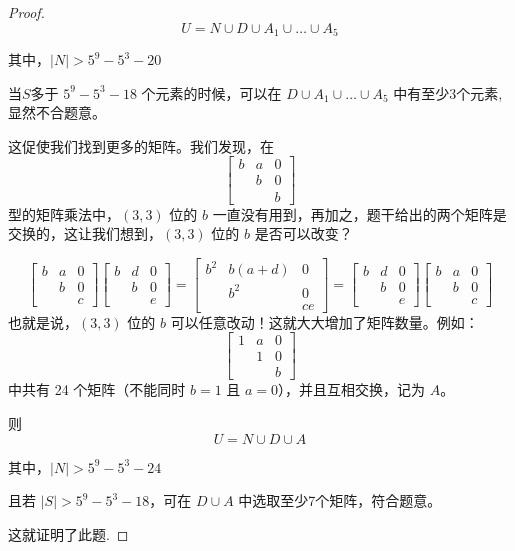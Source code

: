 \documentclass[12pt]{ctexart}  %
\begin{document}
\begin{proof}
\[
U = N \cup D \cup A_1 \cup \dots \cup A_5
\]

其中，$|N|>5^9-5^3-20$

当$S$多于 \(5^9-5^3-18\) 个元素的时候，可以在 \(D\cup A_1 \cup \dots \cup A_5\) 中有至少3个元素,显然不合题意。

这促使我们找到更多的矩阵。我们发现，在
\[
\begin{bmatrix}
b & a & 0 \\
& b & 0 \\
& & b
\end{bmatrix}
\]
型的矩阵乘法中，\((3,3)\) 位的 \(b\) 一直没有用到，再加之，题干给出的两个矩阵是交换的，这让我们想到，\((3,3)\) 位的 \(b\) 是否可以改变？

\[
\begin{bmatrix}
b & a & 0 \\
& b & 0 \\
& & c
\end{bmatrix}
\begin{bmatrix}
b & d & 0 \\
& b & 0 \\
& & e
\end{bmatrix}
=
\begin{bmatrix}
b^2 & b(a+d) & 0 \\
& b^2 & 0 \\
& & ce
\end{bmatrix}
=
\begin{bmatrix}
b & d & 0 \\
& b & 0 \\
& & e
\end{bmatrix}
\begin{bmatrix}
b & a & 0 \\
& b & 0 \\
& & c
\end{bmatrix}
\]
也就是说，\((3,3)\) 位的 \(b\) 可以任意改动！这就大大增加了矩阵数量。例如：
\[
\begin{bmatrix}
1 & a & 0 \\
& 1 & 0 \\
& & b
\end{bmatrix}
\]
中共有 24 个矩阵（不能同时 \(b=1\) 且 \(a=0\)），并且互相交换，记为 \(A\)。

则
\[
U = N \cup D \cup A
\]

其中，$|N|>5^9-5^3-24$

且若 \(|S|>5^9-5^3-18\)，可在 \(D\cup A\) 中选取至少7个矩阵，符合题意。

这就证明了此题.


\end{proof}
\end{document}
